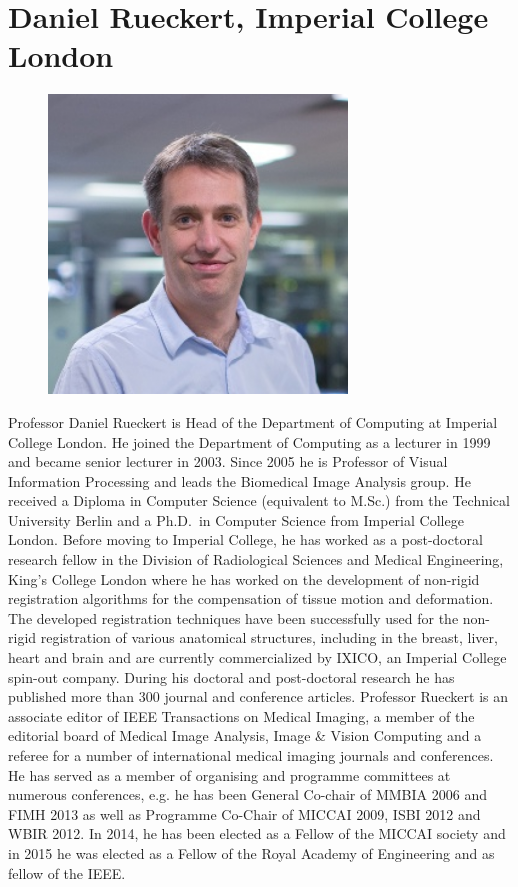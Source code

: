 \documentclass[a5paper,10pt,twoside,onecolumn,openany,helvetica,showtrims]{memoir}
\newlength{\SpeakerSize}
\begin{document}
\section*{Daniel Rueckert, Imperial College London}
\begin{figure}
\includegraphics[width=\SpeakerSize]{SpeakerPics/image6}	
\end{figure}
Professor Daniel Rueckert is Head of the Department of Computing at Imperial College London. He joined the Department of Computing as a lecturer in 1999 and became senior lecturer in 2003. Since 2005 he is Professor of Visual Information Processing and leads the Biomedical Image Analysis group. He received a Diploma in Computer Science (equivalent to M.Sc.) from the Technical University Berlin and a Ph.D.~in Computer Science from Imperial College London. Before moving to Imperial College, he has worked as a post-doctoral research fellow in the Division of Radiological Sciences and Medical Engineering, King’s College London where he has worked on the development of non-rigid registration algorithms for the compensation of tissue motion and deformation. The developed registration techniques have been successfully used for the non-rigid registration of various anatomical structures, including in the breast, liver, heart and brain and are currently commercialized by IXICO, an Imperial College spin-out company. During his doctoral and post-doctoral research he has published more than 300 journal and conference articles. Professor Rueckert is an associate editor of IEEE Transactions on Medical Imaging, a member of the editorial board of Medical Image Analysis, Image \& Vision Computing and a referee for a number of international medical imaging journals and conferences. He has served as a member of organising and programme committees at numerous conferences, e.g. he has been General Co-chair of MMBIA 2006 and FIMH 2013 as well as Programme Co-Chair of MICCAI 2009, ISBI 2012 and WBIR 2012. In 2014, he has been elected as a Fellow of the MICCAI society and in 2015 he was elected as a Fellow of the Royal Academy of Engineering and as fellow of the IEEE.
\end{document}
